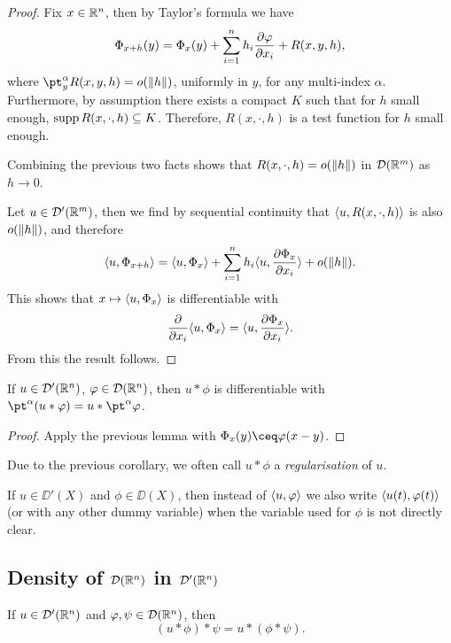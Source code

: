 \begin{proof}
    Fix $x \in \mathbb R^n$, then by Taylor's formula we have
    \[
    \Phi_{x + h}(y) = \Phi_x(y) + \sum_{i=1}^n h_i \pdv{\varphi}{x_i} (x, y)+ R(x, y, h), 
    \]
    where $\pt_y^\alpha R(x, y, h) = o(\norm{h})$, uniformly in $y$, for any multi-index $\alpha$. Furthermore, by assumption there exists a compact $K$ such that for $h$ small enough, $\operatorname{supp} R(x, \cdot, h) \subseteq K$. Therefore, $R(x, \cdot, h)$ is a test function for $h$ small enough.
    
    Combining the previous two facts shows that $R(x, \cdot, h) = o(\norm{h})$ in $\mathcal D(\mathbb R^m)$ as $h \to 0$. 
    
    Let $u \in \mathcal D'(\mathbb R^m)$, then we find by sequential continuity that $\langle u, R(x, \cdot, h)\rangle$ is also $o(\norm{h})$, and therefore
    \[
    \langle u, \Phi_{x+h}\rangle = \langle u, \Phi_x\rangle + \sum_{i=1}^n h_i \langle u, \pdv{\Phi_x}{x_i}\rangle + o(\norm{h}). 
    \]
    This shows that $x \mapsto \langle u, \Phi_x\rangle$ is differentiable with 
    \[
    \pdv{x_i} \langle u, \Phi_x\rangle  = \langle u, \pdv{\Phi_x}{x_i}\rangle. 
    \]
    From this the result follows. 
\end{proof}

\begin{corollary}
    If $u \in \mathcal D'(\mathbb R^n)$, $\varphi \in \mathcal D(\mathbb R^n)$, then $u * \phi$ is differentiable with $\pt^\alpha (u * \phi) = u * \pt^\alpha\phi$. 
\end{corollary}

\begin{proof}
    Apply the previous lemma with $\Phi_x(y) \ceq  \phi(x-y)$. 
\end{proof}

Due to the previous corollary, we often call $u * \phi$ a \emph{regularisation} of $u$. 

\begin{convention}
	If $u \in \DD'(X)$ and $\phi \in \DD(X)$, then instead of $\langle u, \varphi\rangle$ we also write $\langle u(t), \varphi(t)\rangle$ (or with any other dummy variable) when the variable used for $\phi$ is not directly clear. 
\end{convention}

\subsection{Density of $\mathcal D(\mathbb R^n)$ in $\mathcal D'(\mathbb R^n)$}
\begin{lemma}
	If $u \in \mathcal D'(\mathbb R^n)$ and $\varphi, \psi \in \mathcal D(\mathbb R^n)$, then
	\[
	(u * \phi) * \psi = u * (\phi * \psi). 
	\]
\end{lemma}

